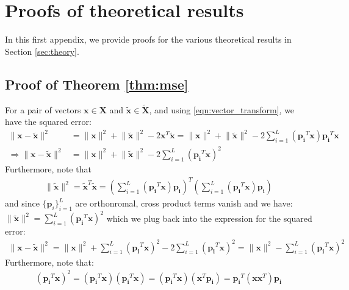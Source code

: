 \documentclass{article}
\theoremstyle{plain}
\begin{document}


\newpage
\begin{center}\end{center}
\appendix
\section{Proofs of theoretical results}
\label{app:proofs}
In this first appendix, we provide proofs for the various theoretical results in Section \ref{sec:theory}.

\subsection{Proof of Theorem \ref{thm:mse}}
\label{app:thm:mse} 
For a pair of vectors $\mathbf{x}\in \mathbf{X}$ and $\tilde{\mathbf{x}}\in\tilde{\mathbf{X}}$, and using \eqref{eqn:vector_transform}, we have the squared error:
\begin{align*}
    \lVert\mathbf{x}-\tilde{\mathbf{x}}\rVert^2 &= \lVert\mathbf{x}\rVert^2 + \lVert\tilde{\mathbf{x}}\rVert^2 -2 \mathbf{x}^T\tilde{\mathbf{x}}= \lVert\mathbf{x}\rVert^2 + \lVert\tilde{\mathbf{x}}\rVert^2 -2\sum_{i=1}^L\left(\mathbf{p_i}^T\mathbf{x}\right)\mathbf{p_i}^T\mathbf{x}\\\Rightarrow\lVert\mathbf{x}-\tilde{\mathbf{x}}\rVert^2&= \lVert\mathbf{x}\rVert^2 + \lVert\tilde{\mathbf{x}}\rVert^2 -2\sum_{i=1}^L\left(\mathbf{p_i}^T\mathbf{x}\right)^2
\end{align*}
Furthermore, note that 
\begin{align*}
    \lVert\tilde{\mathbf{x}}\rVert^2 = \tilde{\mathbf{x}}^T\tilde{\mathbf{x}}=\left(\sum_{i=1}^L\left(\mathbf{p_i}^T\mathbf{x}\right)\mathbf{p_i}\right)^T\left(\sum_{i=1}^L\left(\mathbf{p_i}^T\mathbf{x}\right)\mathbf{p_i}\right)
\end{align*}
and since $\{\mathbf{p}_i\}_{i=1}^L$ are orthonromal, cross product terms vanish and we have: $\lVert\tilde{\mathbf{x}}\rVert^2=\sum_{i=1}^L\left(\mathbf{p_i}^T\mathbf{x}\right)^2$ which we plug back into the expression for the squared error:
\begin{align*}
    \lVert\mathbf{x}-\tilde{\mathbf{x}}\rVert^2=\lVert\mathbf{x}\rVert^2 + \sum_{i=1}^L\left(\mathbf{p_i}^T\mathbf{x}\right)^2 -2\sum_{i=1}^L\left(\mathbf{p_i}^T\mathbf{x}\right)^2 = \lVert\mathbf{x}\rVert^2 - \sum_{i=1}^L\left(\mathbf{p_i}^T\mathbf{x}\right)^2
\end{align*}
Furthermore, note that:
\begin{align*}
\left(\mathbf{p_i}^T\mathbf{x}\right)^2 = \left(\mathbf{p_i}^T\mathbf{x}\right)\left(\mathbf{p_i}^T\mathbf{x}\right) = \left(\mathbf{p_i}^T\mathbf{x}\right)\left(\mathbf{x}^T\mathbf{p_i}\right) = \mathbf{p_i}^T\left(\mathbf{x}\mathbf{x}^T\right)\mathbf{p_i}
\end{align*}
\end{document}
